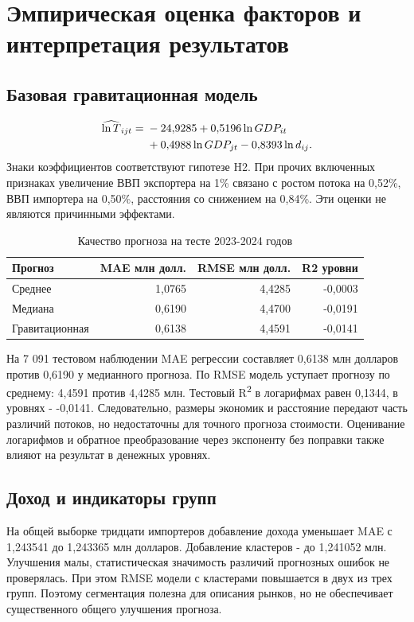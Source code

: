 \documentclass[12pt,a4paper]{article}
\begin{document}
\section{Эмпирическая оценка факторов и интерпретация результатов}
\subsection{Базовая гравитационная модель}
\begin{align}
\widehat{\ln T}_{ijt}={}&-24{,}9285+0{,}5196\ln GDP_{it}\\
&+0{,}4988\ln GDP_{jt}-0{,}8393\ln d_{ij}.\notag
\end{align}
Знаки коэффициентов соответствуют гипотезе H2. При прочих включенных признаках увеличение ВВП экспортера на 1\% связано с ростом потока на 0,52\%, ВВП импортера на 0,50\%, расстояния со снижением на 0,84\%. Эти оценки не являются причинными эффектами.

\begin{table}[H]
\centering
\caption{Качество прогноза на тесте 2023-2024 годов}\label{tab:model}
{\small
\begin{tabular}{lrrr}
\toprule
Прогноз & MAE млн долл. & RMSE млн долл. & R2 уровни \\ \midrule
Среднее & 1,0765 & 4,4285 & -0,0003 \\
Медиана & 0,6190 & 4,4700 & -0,0191 \\
Гравитационная & 0,6138 & 4,4591 & -0,0141 \\
\bottomrule
\end{tabular}}
\par{}
\end{table}
На 7 091 тестовом наблюдении MAE регрессии составляет 0,6138 млн долларов против 0,6190 у медианного прогноза. По RMSE модель уступает прогнозу по среднему: 4,4591 против 4,4285 млн. Тестовый R\textsuperscript{2} в логарифмах равен 0,1344, в уровнях - -0,0141. Следовательно, размеры экономик и расстояние передают часть различий потоков, но недостаточны для точного прогноза стоимости. Оценивание логарифмов и обратное преобразование через экспоненту без поправки также влияют на результат в денежных уровнях.

\subsection{Доход и индикаторы групп}
На общей выборке тридцати импортеров добавление дохода уменьшает MAE с 1,243541 до 1,243365 млн долларов. Добавление кластеров - до 1,241052 млн. Улучшения малы, статистическая значимость различий прогнозных ошибок не проверялась. При этом RMSE модели с кластерами повышается в двух из трех групп. Поэтому сегментация полезна для описания рынков, но не обеспечивает существенного общего улучшения прогноза.
\end{document}
